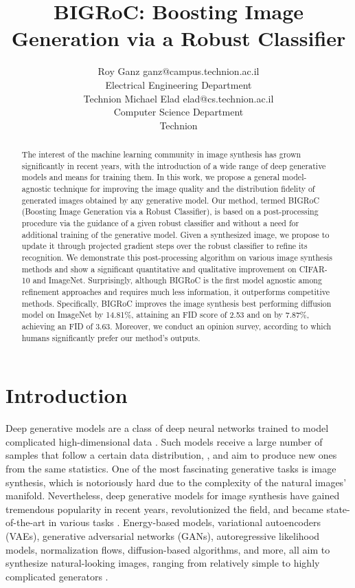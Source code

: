 \documentclass[10pt]{article} \usepackage[accepted]{tmlr}
\title{BIGRoC: Boosting Image Generation via a Robust Classifier}
\author{\name Roy Ganz \email ganz@campus.technion.ac.il \\
      \addr Electrical Engineering Department\\
      Technion
      \AND
      \name Michael Elad \email elad@cs.technion.ac.il \\
      \addr Computer Science Department \\
      Technion
      }
\begin{document}
\maketitle
\begin{abstract}
The interest of the machine learning community in image synthesis has grown significantly in recent years, with the introduction of a wide range of deep generative models and means for training them.
In this work, we propose a general model-agnostic technique for improving the image quality and the distribution fidelity of generated images obtained by any generative model.
Our method, termed BIGRoC (Boosting Image Generation via a Robust Classifier), is based on a post-processing procedure via the guidance of a given robust classifier and without a need for additional training of the generative model.
Given a synthesized image, we propose to update it through projected gradient steps over the robust classifier to refine its recognition.
We demonstrate this post-processing algorithm on various image synthesis methods and show a significant quantitative and qualitative improvement on CIFAR-10 and ImageNet.
Surprisingly, although BIGRoC is the first model agnostic among refinement approaches and requires much less information, it outperforms competitive methods.
Specifically, BIGRoC improves the image synthesis best performing diffusion model on ImageNet  by 14.81\%, attaining an FID score of 2.53 and on  by 7.87\%, achieving an FID of 3.63.
Moreover, we conduct an opinion survey, according to which humans significantly prefer our method's outputs.
\end{abstract}

\section{Introduction}
\label{intro}
Deep generative models are a class of deep neural networks trained to model complicated high-dimensional data \citep{bondtaylor2021deep}. 
Such models receive a large number of samples that follow a certain data distribution, , and aim to produce new ones from the same statistics. 
One of the most fascinating generative tasks is image synthesis, which is notoriously hard due to the complexity of the natural images' manifold.
Nevertheless, deep generative models for image synthesis have gained tremendous popularity in recent years, revolutionized the field, and became state-of-the-art in various tasks \citep{cyclegan, zhu2020unpaired, progan,stylegan, brock2019large, karras2020analyzing}.
Energy-based models, variational autoencoders (VAEs), generative adversarial networks (GANs), autoregressive likelihood models, normalization flows, diffusion-based algorithms, and more, all aim to synthesize natural-looking images, ranging from relatively simple to highly complicated generators \citep{kingma2014autoencoding, goodfellow2014generative, rezende2016variational, oord2016pixel, ho2020denoising}.
\end{document}

